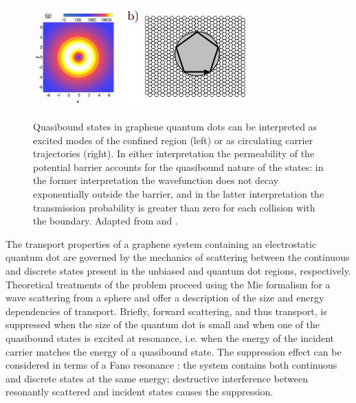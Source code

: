 \documentclass[edeposit,fullpage,draftthesis]{uiucthesis2009}
\begin{document}
            \begin{figure}
            \centering
            \includegraphics[width=0.3\textwidth]{images/background/qb_density.png}
            \includegraphics[width=0.45\textwidth]{images/background/qb_rays.png}
            \caption[Quasibound states in graphene quantum dots]{
            Quasibound states in graphene quantum dots can be interpreted as excited modes of the
            confined region (left) or as circulating carrier trajectories (right). 
            In either interpretation the permeability of the potential barrier accounts for
            the quasibound nature of the states: in the former interpretation the wavefunction
            does not decay exponentially outside the barrier, and in the latter interpretation
            the transmission probability is greater than zero for each collision with the boundary.
            Adapted from \cite{heinisch2013mie} and \cite{bardarson2009electrostatic}.
            }
            \label{fig:qb_states}
            \end{figure}
        
        The transport properties of a graphene system containing an electrostatic quantum dot
        are governed by the mechanics of scattering between the continuous and discrete states
        present in the unbiased and quantum dot regions, respectively. Theoretical treatments of the
        problem \cite{heinisch2013mie, bardarson2009electrostatic}
        proceed using the Mie formalism \cite{mie1908beitrage} for a wave scattering from a sphere 
        and offer a description of the
        size and energy dependencies of transport. Briefly, forward scattering, and thus transport,
        is suppressed when the size of the quantum dot is small and
        when one of the quasibound states is excited at resonance,
        i.e. when the energy of the incident carrier matches the energy of a quasibound state.
        The suppression effect can be considered in terms of a Fano resonance \cite{fano1961effects}:
        the system contains both continuous and discrete states at the same energy;
        destructive interference between resonantly scattered and incident states causes the suppression.
        
\end{document}
